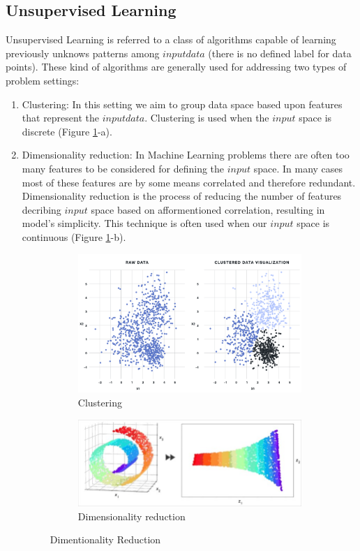 \documentclass[12pt]{article}
\begin{document}
\subsection{Unsupervised Learning}
Unsupervised Learning is referred to a class of algorithms capable of learning previously unknows patterns among $input data$ (there is no defined label for data points). These kind of algorithms are generally used for addressing two types of problem settings:
\begin{enumerate}
\item Clustering: In this setting we aim to group data space based upon features that represent the $input data$. Clustering is used when the $input$ space is discrete (Figure \ref{fig:tsne}-a).
\item Dimensionality reduction: In Machine Learning problems there are often too many features to be considered for defining the $input$ space. In many cases most of these features are by some means correlated and therefore redundant. Dimensionality reduction is the process of reducing the number of features decribing $input$ space based on afformentioned correlation, resulting in model's simplicity. This technique is often used when our $input$ space is continuous (Figure \ref{fig:tsne}-b).
\begin{figure}[h!]
  \centering  
  \begin{subfigure}[b]{0.4\linewidth}
  	\centering
    \includegraphics[width=\linewidth]{./images/clustering.png}
    \caption{Clustering}
  \end{subfigure} 
  \begin{subfigure}[b]{0.4\linewidth}
    \includegraphics[width=\linewidth]{./images/reduction.jpg}
    \caption{Dimensionality reduction}
  \end{subfigure}
  \caption{Dimentionality Reduction}
  \label{fig:tsne}
\end{figure}
\end{enumerate}
\end{document}
